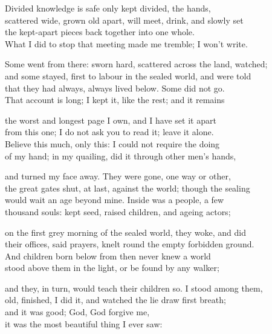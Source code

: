 \begin{founder}
Divided knowledge is safe only kept divided, the hands,\\
scattered wide, grown old apart, will meet, drink, and slowly set\\
the kept-apart pieces back together into one whole.\\
What I did to stop that meeting made me tremble; I won't write.\\
\medskip

Some went from there: sworn hard, scattered across the land, watched;\\
and some stayed, first to labour in the sealed world, and were told\\
that they had always, always lived below. Some did not go.\\
That account is long; I kept it, like the rest; and it remains\\
\medskip

the worst and longest page I own, and I have set it apart\\
from this one; I do not ask you to read it; leave it alone.\\
Believe this much, only this: I could not require the doing\\
of my hand; in my quailing, did it through other men's hands,\\
\medskip

and turned my face away. They were gone, one way or other,\\
the great gates shut, at last, against the world; though the sealing\\
would wait an age beyond mine. Inside was a people, a few\\
thousand souls: kept seed, raised children, and ageing actors;\\
\medskip

on the first grey morning of the sealed world, they woke, and did\\
their offices, said prayers, knelt round the empty forbidden ground.\\
And children born below from then never knew a world\\
stood above them in the light, or be found by any walker;\\
\medskip

and they, in turn, would teach their children so. I stood among them,\\
old, finished, I did it, and watched the lie draw first breath;\\
and it was good; God, God forgive me,\\
it was the most beautiful thing I ever saw:\\
\medskip


\end{founder}
